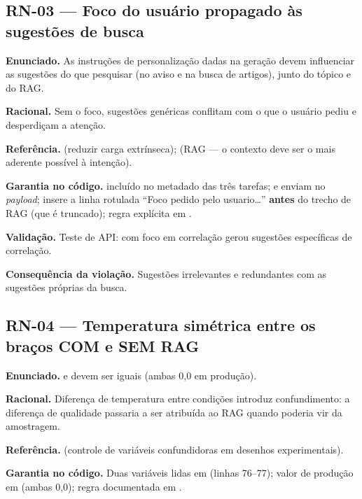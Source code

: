\subsection{RN-03 --- Foco do usuário propagado às sugestões de busca}

\textbf{Enunciado.} As instruções de personalização dadas na geração devem influenciar as sugestões do que pesquisar (no aviso e na busca de artigos), junto do tópico e do RAG.

\textbf{Racional.} Sem o foco, sugestões genéricas conflitam com o que o usuário pediu e desperdiçam a atenção.

\textbf{Referência.} \cite{kirschner_sweller_clark_2006} (reduzir carga extrínseca); \cite{lewis_2020} (RAG --- o contexto deve ser o mais aderente possível à intenção).

\textbf{Garantia no código.} \texttt{} incluído no metadado \texttt{} das três tarefas; \texttt{} e \texttt{} enviam \texttt{} no \emph{payload}; \texttt{} insere a linha rotulada ``Foco pedido pelo usuario\dots'' \textbf{antes} do trecho de RAG (que é truncado); regra explícita em .

\textbf{Validação.} Teste de API: \texttt{} com foco em correlação gerou sugestões específicas de correlação.

\textbf{Consequência da violação.} Sugestões irrelevantes e redundantes com as sugestões próprias da busca.

\subsection{RN-04 --- Temperatura simétrica entre os braços COM e SEM RAG}

\textbf{Enunciado.} \texttt{} e \texttt{} devem ser iguais (ambas 0,0 em produção).

\textbf{Racional.} Diferença de temperatura entre condições introduz confundimento: a diferença de qualidade passaria a ser atribuída ao RAG quando poderia vir da amostragem.

\textbf{Referência.} \cite{shadish_cook_campbell_2002} (controle de variáveis confundidoras em desenhos experimentais).

\textbf{Garantia no código.} Duas variáveis lidas em  (linhas 76--77); valor de produção em \texttt{} (ambas 0,0); regra documentada em .

